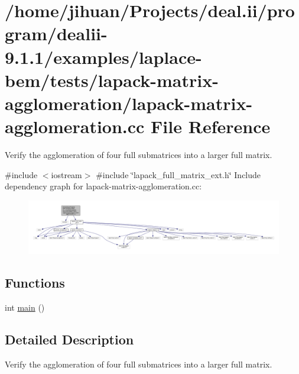 \hypertarget{lapack-matrix-agglomeration_8cc}{}\section{/home/jihuan/\+Projects/deal.ii/program/dealii-\/9.1.1/examples/laplace-\/bem/tests/lapack-\/matrix-\/agglomeration/lapack-\/matrix-\/agglomeration.cc File Reference}
\label{lapack-matrix-agglomeration_8cc}


Verify the agglomeration of four full submatrices into a larger full matrix.  


{\ttfamily \#include $<$iostream$>$}\newline
{\ttfamily \#include \char`\"{}lapack\+\_\+full\+\_\+matrix\+\_\+ext.\+h\char`\"{}}\newline
Include dependency graph for lapack-\/matrix-\/agglomeration.cc\+:
\nopagebreak
\begin{figure}[H]
\begin{center}
\leavevmode
\includegraphics[width=350pt]{lapack-matrix-agglomeration_8cc__incl}
\end{center}
\end{figure}
\subsection*{Functions}
\begin{DoxyCompactItemize}
\item 
int \hyperlink{lapack-matrix-agglomeration_8cc_ae66f6b31b5ad750f1fe042a706a4e3d4}{main} ()
\end{DoxyCompactItemize}


\subsection{Detailed Description}
Verify the agglomeration of four full submatrices into a larger full matrix. 

